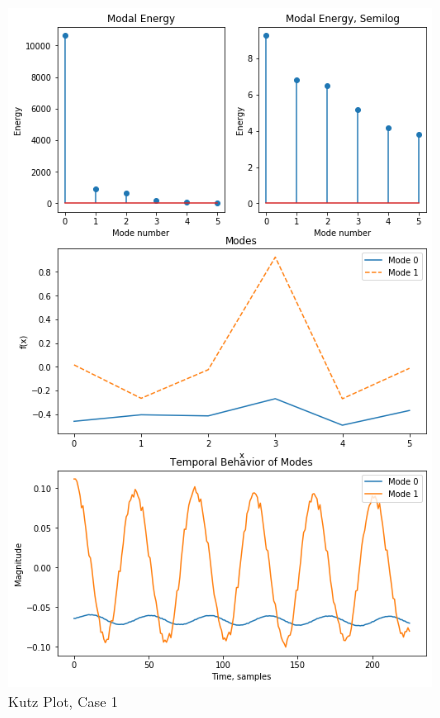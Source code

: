 \documentclass[journal]{IEEEtran}
\begin{document}
\begin{figure}
	\centerline{\includegraphics[width=\columnwidth]{kutz1.png}}
	\caption{Kutz Plot, Case 1}
	\label{kutz1}
\end{figure}
\end{document}
